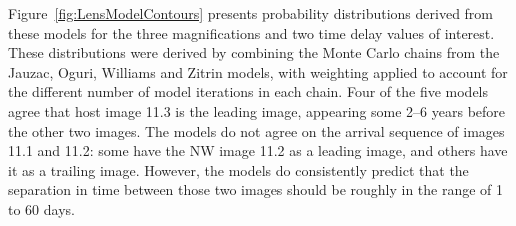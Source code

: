 Figure~\ref{fig:LensModelContours} presents probability distributions
derived from these models for the three magnifications and two time
delay values of interest.  These distributions were derived by
combining the Monte Carlo chains from the Jauzac, Oguri, Williams and
Zitrin models, with weighting applied to account for the different
number of model iterations in each chain. Four of the five models
agree that host image 11.3 is the leading image, appearing some 2--6
years before the other two images.  The models do not agree on the
arrival sequence of images 11.1 and 11.2: some have the NW image 11.2
as a leading image, and others have it as a trailing image.  However,
the models do consistently predict that the separation in time between
those two images should be roughly in the range of 1 to 60 days.
